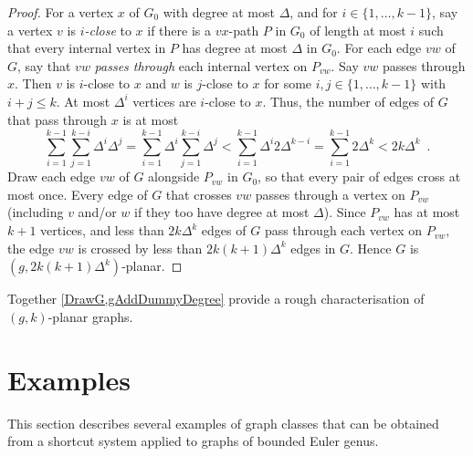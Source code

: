 \documentclass{patmorin}
\renewcommand{\leq}{\leqslant}
\begin{document}
\begin{proof}
For a vertex $x$ of $G_0$ with degree at most $\Delta$, and for $i\in\{1,\dots,k-1\}$, say a vertex $v$ is \emph{$i$-close} to $x$ if there is a $vx$-path $P$ in $G_0$ of length at most $i$ such that every internal vertex in $P$  has degree at most $\Delta$ in $G_0$. 
For each edge $vw$ of $G$, say that $vw$ \emph{passes through} each internal vertex on $P_{vw}$. 
Say $vw$ passes through $x$. Then $v$ is $i$-close to $x$ and $w$ is $j$-close to $x$ for some $i,j\in\{1,\dots,k-1\}$ with $i+j\leq k$. At most $\Delta^{i}$ vertices are $i$-close to $x$. 
Thus, the number of edges of $G$ that pass through $x$ is at most 
\[
\sum_{i=1}^{k-1} \sum_{j=1}^{k-i} \Delta^i \Delta^j 
= \sum_{i=1}^{k-1} \Delta^i  \sum_{j=1}^{k-i} \Delta^j 
< \sum_{i=1}^{k-1} \Delta^i  2 \Delta^{k-i}
= \sum_{i=1}^{k-1} 2\Delta^k 
< 2k \Delta^k \enspace.
\]
Draw each edge $vw$ of $G$ alongside $P_{vw}$ in $G_0$, so that every pair of edges cross at most once. 
Every edge of $G$ that crosses $vw$ passes through a vertex on $P_{vw}$ (including $v$ and/or $w$ if they too have degree at most $\Delta$). Since $P_{vw}$ has at most $k+1$ vertices, and less than $2k\Delta^{k}$ edges of $G$ pass through each vertex on $P_{vw}$, the edge $vw$ is crossed by less than $2k(k+1)\Delta^{k}$ edges in $G$. Hence $G$ is $(g, 2k(k+1)\Delta^{k} )$-planar.
\end{proof}

Together \cref{DrawG,gAddDummyDegree} provide a rough characterisation of $(g,k)$-planar graphs. 

\section{Examples}
\label{Examples}

This section describes several examples of graph classes that can be obtained from a shortcut system applied to graphs of bounded Euler genus.  


\end{document}
